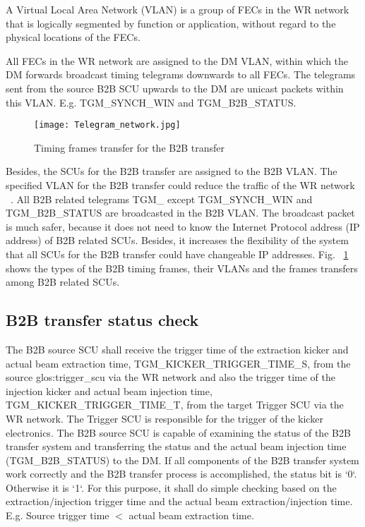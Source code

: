 A Virtual Local Area Network (VLAN) is a group of FECs in the WR network that is logically segmented by function or application, without regard to the physical locations of the FECs. 

All FECs in the WR network are assigned to the DM VLAN, within which the DM forwards broadcast timing telegrams downwards to all FECs. The telegrams sent from the source B2B SCU upwards to the DM are unicast packets within this VLAN. E.g. TGM\_SYNCH\_WIN and TGM\_B2B\_STATUS. 


\begin{landscape}
\begin{figure}[H]
   \centering   
   \texttt{[image: Telegram\_network.jpg]}
   \caption{Timing frames transfer for the B2B transfer}
   \label{Telegram_network}
\end{figure}  
\end{landscape}

Besides, the SCUs for the B2B transfer are assigned to the B2B \gls{VLAN}. The specified VLAN for the B2B transfer could reduce the traffic of the WR network ~\cite{bai_concept_2016}. All B2B related telegrams TGM\_ except TGM\_SYNCH\_WIN and TGM\_B2B\_STATUS are broadcasted in the B2B VLAN. The broadcast packet is much safer, because it does not need to know the Internet Protocol address (\gls{IP} address) of B2B related SCUs. Besides, it increases the flexibility of the system that all SCUs for the B2B transfer could have changeable IP addresses. Fig. ~\ref{Telegram_network} shows the types of the B2B timing frames, their VLANs and the frames transfers among B2B related SCUs.

\subsection{B2B transfer status check}
The B2B source SCU shall receive the trigger time of the extraction kicker and actual beam extraction time, TGM\_KICKER\_TRIGGER\_TIME\_S, from the source \gls{glos:trigger_scu} via the WR network and also the trigger time of the injection kicker and actual beam injection time, TGM\_KICKER\_TRIGGER\_TIME\_T, from the target Trigger SCU via the WR network. The Trigger SCU is responsible for the trigger of the kicker electronics. The B2B source SCU is capable of examining the status of the B2B transfer system and transferring the status and the actual beam injection time  (TGM\_B2B\_STATUS) to the DM. If all components of the B2B transfer system work correctly and the B2B transfer process is accomplished, the status bit is `0`. Otherwise it is `1`. For this purpose, it shall do simple checking based on the extraction/injection trigger time and the actual beam extraction/injection time. E.g. Source trigger time $<$ actual beam extraction time.
